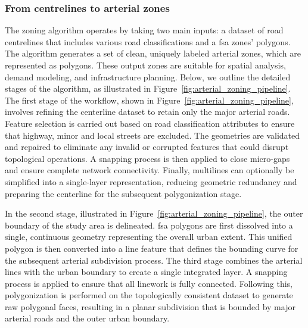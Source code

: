 
\subsubsection{From centrelines to arterial zones}\label{sec:derived_AZ}
The zoning algorithm operates by taking two main inputs: a dataset of road centrelines that includes various road classifications and a \gls{fsa} zones' polygons. The algorithm generates a set of clean, uniquely labeled arterial zones, which are represented as polygons. These output zones are suitable for spatial analysis, demand modeling, and infrastructure planning. Below, we outline the detailed stages of the algorithm, as illustrated in Figure~\ref{fig:arterial_zoning_pipeline}.
The first stage of the workflow, shown in Figure~\ref{fig:arterial_zoning_pipeline}, involves refining the centerline dataset to retain only the major arterial roads. Feature selection is carried out based on road classification attributes to ensure that highway, minor and local streets are excluded. The geometries are validated and repaired to eliminate any invalid or corrupted features that could disrupt topological operations. A snapping process is then applied to close micro-gaps and ensure complete network connectivity. Finally, multilines can optionally be simplified into a single-layer representation, reducing geometric redundancy and preparing the centerline for the subsequent polygonization stage.

In the second stage, illustrated in Figure~\ref{fig:arterial_zoning_pipeline}, the outer boundary of the study area is delineated. \Gls{fsa} polygons are first dissolved into a single, continuous geometry representing the overall urban extent. This unified polygon is then converted into a line feature that defines the bounding curve for the subsequent arterial subdivision process.
The third stage combines the arterial lines with the urban boundary to create a single integrated layer. A snapping process is applied to ensure that all linework is fully connected. Following this, polygonization is performed on the topologically consistent dataset to generate raw polygonal faces, resulting in a planar subdivision that is bounded by major arterial roads and the outer urban boundary.

